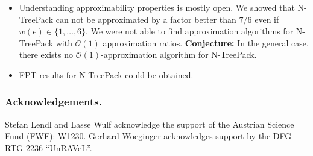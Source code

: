 \documentclass[runningheads]{llncs}
\newcommand{\set}[1]{\{ #1 \}}
\newcommand{\fromto}[2]{\set{#1, \ldots, #2}}
\newcommand{\bigO}{\mathcal{O}}
\newcommand{\xxxNTP}{{\sc N-TreePack}}
\begin{document}
\begin{itemize}
\item Understanding approximability properties is mostly open. We showed that {\xxxNTP} can not be approximated 
by a factor better than $7/6$ even if $w(e) \in \fromto{1}{6}$. 
We were not able to find approximation algorithms for {\xxxNTP} with $\bigO(1)$ approximation ratios. 
\textbf{Conjecture:} In the general case, there exists no $\bigO(1)$-approximation algorithm for {\xxxNTP}.
\item FPT results for {\xxxNTP} could be obtained. 
\end{itemize}


\subsubsection*{Acknowledgements.}

Stefan Lendl and Lasse Wulf acknowledge the support of the Austrian Science Fund (FWF): W1230.
Gerhard Woeginger acknowledges support by the DFG RTG 2236 ``UnRAVeL''.

%
%



\end{document}
